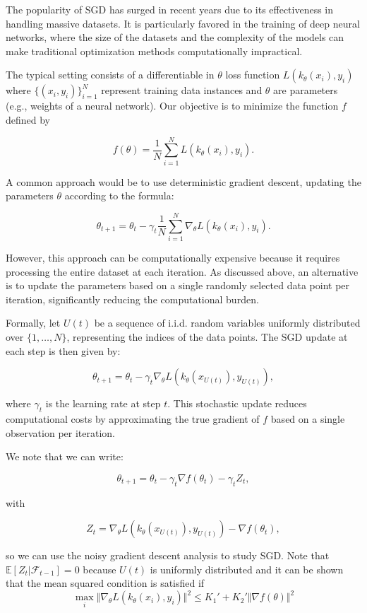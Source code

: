 \documentclass[letter,11pt]{article}
\begin{document}
The popularity of SGD has surged in recent years due to its effectiveness in handling massive datasets. It is particularly favored in the training of deep neural networks, where the size of the datasets and the complexity of the models can make traditional optimization methods computationally impractical. 


The typical setting consists of a differentiable in $\theta$ loss function \( L(k_\theta(x_{i}), y_i) \) where \( \{(x_i, y_i)\}_{i=1}^N \) represent training data instances and $\theta$ are parameters (e.g., weights of a neural network). Our objective is to minimize the function \( f \) defined by

\[ 
f(\theta) = \frac{1}{N} \sum_{i=1}^{N} L(k_\theta(x_i), y_i).
\]

A common approach would be to use deterministic gradient descent, updating the parameters \( \theta \) according to the formula:

\[ 
\theta_{t+1} = \theta_t - \gamma_t \frac{1}{N} \sum_{i=1}^{N} \nabla_\theta L(k_\theta(x_i), y_i).
\]

However, this approach can be computationally expensive because it requires processing the entire dataset at each iteration. As discussed above, an alternative is to update the parameters based on a single randomly selected data point per iteration, significantly reducing the computational burden.

Formally, let \( U(t) \) be a sequence of i.i.d. random variables uniformly distributed over \( \{1, \ldots, N\} \), representing the indices of the data points. The SGD update at each step is then given by:

\[
\theta_{t+1} = \theta_t - \gamma_t \nabla_\theta L(k_\theta(x_{U(t)}), y_{U(t)}),
\]

where \( \gamma_t \) is the learning rate at step \( t \). This stochastic update reduces computational costs by approximating the true gradient of \( f \) based on a single observation per iteration.

We note that we can write:

\[
\theta_{t+1} = \theta_t - \gamma_t \nabla f(\theta_{t})  - \gamma_t Z_{t},
\]

with 

\[
Z_{t} = \nabla_\theta L(k_\theta(x_{U(t)}), y_{U(t)}) -  \nabla f(\theta_{t}),
\]

so we can use the noisy gradient descent analysis to study SGD. Note that $\mathbb{E}[Z_{t} | \mathcal{F}_{t-1} ] = 0$ because $U(t)$ is uniformly distributed  
and it can be shown that the mean squared condition is satisfied if
\[
\max _{i} \Vert \nabla_\theta L(k_\theta(x_i), y_i) \Vert ^{2} \leq K_{1}' + K_{2}' \Vert \nabla f(\theta) \Vert ^{2}
\]
\end{document}
